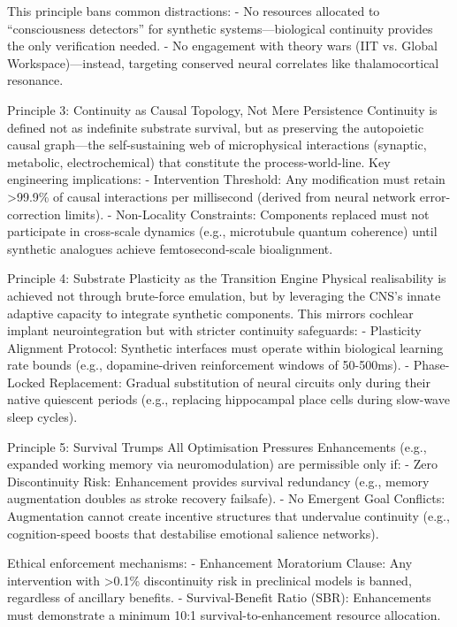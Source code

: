 \documentclass[10pt]{article}
\begin{document}
\begin{sloppypar}
  This principle bans common distractions:
  - No resources allocated to “consciousness detectors” for synthetic systems—biological continuity provides the only verification needed.
  - No engagement with theory wars (IIT vs. Global Workspace)—instead, targeting conserved neural correlates like thalamocortical resonance.

  Principle 3: Continuity as Causal Topology, Not Mere Persistence
  Continuity is defined not as indefinite substrate survival, but as preserving the autopoietic causal graph—the self-sustaining web of microphysical interactions (synaptic, metabolic, electrochemical) that constitute the process-world-line. Key engineering implications:
  - Intervention Threshold: Any modification must retain >99.9\% of causal interactions per millisecond (derived from neural network error-correction limits).
  - Non-Locality Constraints: Components replaced must not participate in cross-scale dynamics (e.g., microtubule quantum coherence) until synthetic analogues achieve femtosecond-scale bioalignment.

  Principle 4: Substrate Plasticity as the Transition Engine
  Physical realisability is achieved not through brute-force emulation, but by leveraging the CNS’s innate adaptive capacity to integrate synthetic components. This mirrors cochlear implant neurointegration but with stricter continuity safeguards:
  - Plasticity Alignment Protocol: Synthetic interfaces must operate within biological learning rate bounds (e.g., dopamine-driven reinforcement windows of 50-500ms).
  - Phase-Locked Replacement: Gradual substitution of neural circuits only during their native quiescent periods (e.g., replacing hippocampal place cells during slow-wave sleep cycles).

  Principle 5: Survival Trumps All Optimisation Pressures
  Enhancements (e.g., expanded working memory via neuromodulation) are permissible only if:
  - Zero Discontinuity Risk: Enhancement provides survival redundancy (e.g., memory augmentation doubles as stroke recovery failsafe).
  - No Emergent Goal Conflicts: Augmentation cannot create incentive structures that undervalue continuity (e.g., cognition-speed boosts that destabilise emotional salience networks).

  Ethical enforcement mechanisms:
  - Enhancement Moratorium Clause: Any intervention with >0.1\% discontinuity risk in preclinical models is banned, regardless of ancillary benefits.
  - Survival-Benefit Ratio (SBR): Enhancements must demonstrate a minimum 10:1 survival-to-enhancement resource allocation.


\end{sloppypar}
\end{document}
